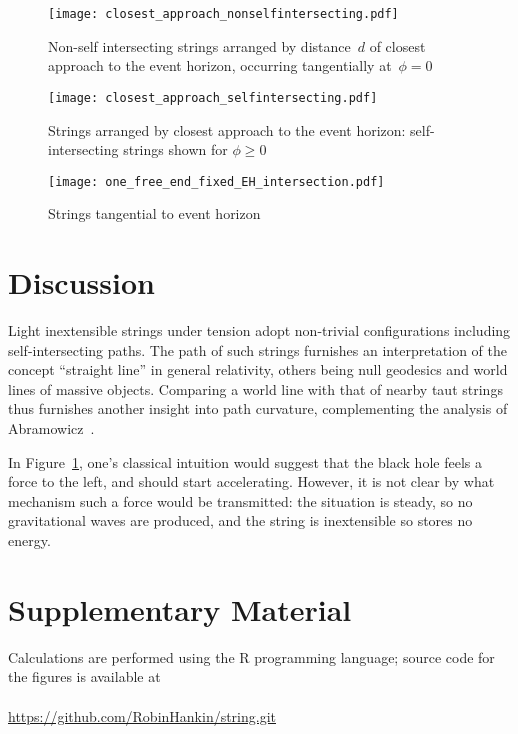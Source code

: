 \documentclass[times,twocolumn,final]{elsarticle}
\begin{document}
\begin{figure}[h!] %
\centering
\texttt{[image: closest\_approach\_nonselfintersecting.pdf]}
\caption{Non-self intersecting strings arranged by distance~$d$ of
  closest approach to the event horizon, occurring tangentially
  at~$\phi=0$}
\label{closest_approach_non_self_intersecting}
\end{figure}

\begin{figure}[h!] %
\centering
\texttt{[image: closest\_approach\_selfintersecting.pdf]}
\caption{Strings arranged by closest approach to the event horizon:
 self-intersecting strings shown for $\phi\geq 0$}
\label{closest_approach_self_intersecting}
\end{figure}

\begin{figure}[h!] %
\centering
\texttt{[image: one\_free\_end\_fixed\_EH\_intersection.pdf]}
\caption{Strings tangential to event horizon}
\label{fixed_EH_intersection}
\end{figure}

\section{Discussion}

Light inextensible strings under tension adopt non-trivial
configurations including self-intersecting paths.  The path of such
strings furnishes an interpretation of the concept ``straight line''
in general relativity, others being null geodesics and world lines of
massive objects.  Comparing a world line with that of nearby taut
strings thus furnishes another insight into path curvature,
complementing the analysis of Abramowicz~\cite{abramowicz1992}.

In Figure~\ref{closest_approach_non_self_intersecting}, one's
classical intuition would suggest that the black hole feels a force to
the left, and should start accelerating.  However, it is not clear by
what mechanism such a force would be transmitted: the situation is
steady, so no gravitational waves are produced, and the string is
inextensible so stores no energy.




\section*{Supplementary Material}

Calculations are performed using the R programming language; source
code for the figures is available at
\\
\\
\url{https://github.com/RobinHankin/string.git}
\end{document}
